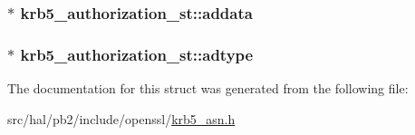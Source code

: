 \subsubsection[{\texorpdfstring{addata}{addata}}]{$\ast$ krb5\+\_\+authorization\+\_\+st\+::addata}\hypertarget{structkrb5__authorization__st_a26158edad70a1f032c0203033439a5cf}{}\label{structkrb5__authorization__st_a26158edad70a1f032c0203033439a5cf}
\subsubsection[{\texorpdfstring{adtype}{adtype}}]{$\ast$ krb5\+\_\+authorization\+\_\+st\+::adtype}\hypertarget{structkrb5__authorization__st_a3e75f4cc0ea59482895df0c540561f82}{}\label{structkrb5__authorization__st_a3e75f4cc0ea59482895df0c540561f82}


The documentation for this struct was generated from the following file\+:\begin{DoxyCompactItemize}
\item 
src/hal/pb2/include/openssl/\hyperlink{krb5__asn_8h}{krb5\+\_\+asn.\+h}\end{DoxyCompactItemize}
